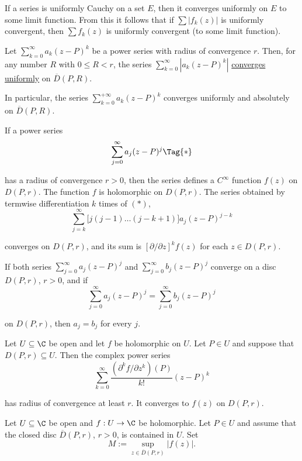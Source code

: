 If a series is uniformly Cauchy on a set $E$, then it converges uniformly on
$E$ to some limit function. From this it follows that if $\sum|f_k(z)|$ is
uniformly convergent, then $\sum f_k(z)$ is uniformly convergent (to some limit
function).

\label{ec076c1}

Let $\sum_{k=0}^\infty a_k(z-P)^k$ be a power series with radius of convergence
$r$. Then, for any number $R$ with $0\leq R<r$, the series
$\sum_{k=0}^\infty|a_k(z-P)^k|$ \href{bba67e4}{converges uniformly} on
$\overline D(P,R)$.

In particular, the series $\sum_{k=0}^{+\infty}a_k(z-P)^k$ converges uniformly
and absolutely on $\overline D(P,R)$.

\label{ccf2595}

If a power series
\begin{equation*}
  \sum_{j=0}^\infty a_j(z-P)^j\Tag{*}
\end{equation*}

has a radius of convergence $r>0$, then the series defines a $C^\infty$
function $f(z)$ on $D(P,r)$. The function $f$ is holomorphic on $D(P,r)$. The
series obtained by termwise differentiation $k$ times of $(*)$,
$$
  \sum_{j=k}^\infty\Big[j(j-1)\ldots(j-k+1)\Big]a_j(z-P)^{j-k}
$$

converges on $D(P,r)$, and its sum is $[\partial/\partial z]^kf(z)$ for each
$z\in D(P,r)$.

\label{ea8c930}

If both series $\sum_{j=0}^\infty a_j(z-P)^j$ and $\sum_{j=0}^\infty
b_j(z-P)^j$ converge on a disc $D(P,r)$, $r>0$, and if
$$
  \sum_{j=0}^\infty a_j(z-P)^j=\sum_{j=0}^\infty b_j(z-P)^j
$$

on $D(P,r)$, then $a_j=b_j$ for every $j$.

\label{b43209d}

Let $U\subseteq\C$ be open and let $f$ be holomorphic on $U$. Let $P\in U$ and
suppose that $D(P,r)\subseteq U$. Then the complex power series
$$
  \sum_{k=0}^\infty\frac{(\partial^kf/\partial z^k)(P)}{k!}(z-P)^k
$$

has radius of convergence at least $r$. It converges to $f(z)$ on $D(P,r)$.

\label{a2d8611}

Let $U\subseteq\C$ be open and $f:U\to\C$ be holomorphic. Let $P\in U$ and
assume that the closed disc $\overline D(P,r)$, $r>0$, is contained in $U$. Set
$$
  M:=\sup_{z\in\overline D(P,r)}|f(z)|.
$$


